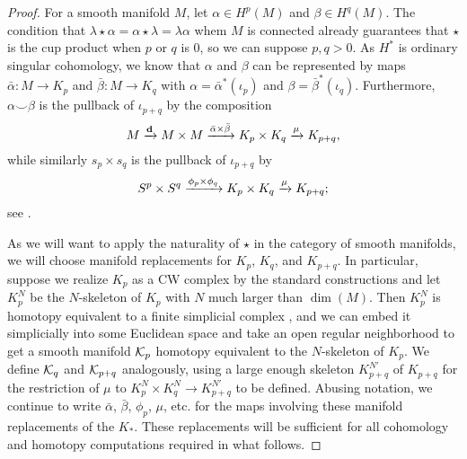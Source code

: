 \begin{proof}
	For a smooth manifold $M$, let $\alpha \in H^p(M)$ and $\beta \in H^q(M)$.
	The condition that $\lambda\star \alpha = \alpha\star \lambda = \lambda\alpha$ whem $M$ is connected already guarantees that $\star$ is the cup product when $p$ or $q$ is $0$, so we can suppose $p,q>0$.
	As $H^*$ is ordinary singular cohomology, we know that $\alpha$ and $\beta$ can be represented by maps $\bar \alpha \colon M \to K_p$ and $\bar\beta \colon M \to K_q$ with $\alpha = \bar \alpha^*(\iota_p)$ and $\beta = \bar\beta^*(\iota_q)$.
	Furthermore, $\alpha\smile \beta$ is the pullback of $\iota_{p+q}$ by the composition
	\begin{equation}\label{E: EM cross}
		M \xrightarrow{\mathbf{d}} M \times M \xrightarrow{\bar\alpha \times \bar \beta} K_p \times K_q \xrightarrow{\mu} K_{p+q},
	\end{equation}
	while similarly $s_p \times s_q$ is the pullback of $\iota_{p+q}$ by
	\begin{equation}\label{E: sphere cross}
		S^p \times S^q \xrightarrow{\phi_p \times \phi_q} K_p \times K_q \xrightarrow{\mu} K_{p+q};
	\end{equation}
	see \cite[Section 4.3]{Hatc02}.

	As we will want to apply the naturality of $\star$ in the category of smooth manifolds, we will choose manifold replacements for $K_p$, $K_q$, and $K_{p+q}$.
	In particular, suppose we realize $K_p$ as a CW complex by the standard constructions and let $K_p^N$ be the $N$-skeleton of $K_p$ with $N$ much larger than $\dim(M)$.
	Then $K_p^N$ is homotopy equivalent to a finite simplicial complex \cite[Theorem 2C.5]{Hatc02}, and we can embed it simplicially into some Euclidean space and take an open regular neighborhood to get a smooth manifold $\mathcal{K}_p$ homotopy equivalent to the $N$-skeleton of $K_p$.
	We define $\mathcal{K}_q$ and $\mathcal{K}_{p+q}$ analogously, using a large enough skeleton $K^{N'}_{p+q}$ of $K_{p+q}$ for the restriction of $\mu$ to $K_p^N \times K_q^N \to K_{p+q}^{N'}$ to be defined.
	Abusing notation, we continue to write $\bar \alpha$, $\bar \beta$, $\phi_p$, $\mu$, etc.
	for the maps involving these manifold replacements of the $K_*$.
	These replacements will be sufficient for all cohomology and homotopy computations required in what follows.


\end{proof}

